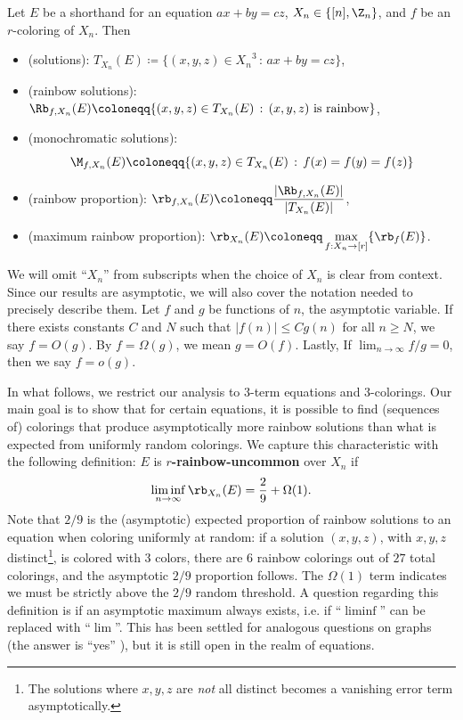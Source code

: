 Let $E$ be a shorthand for an equation $ax + by = cz$,
$X_n \in \{[n], \Z_n\}$, and $f$ be an $r$-coloring of $X_n$. Then
\begin{itemize}
    \item (solutions): $T_{X_n}(E) \coloneqq \{(x, y, z) \in {X_n}^3 \,:\, ax + by = cz\}$,
    \item (rainbow solutions): $\Rb_{f, X_n}(E) \coloneqq \{(x,y,z) \in T_{X_n}(E) \,:\, \text{$(x,y,z)$ is rainbow}\}$,
    \item (monochromatic solutions): 
    \[\M_{f, X_n}(E) \coloneqq \{(x,y,z) \in T_{X_n}(E) \,:\, f(x) = f(y) = f(z)\}\]
    \item (rainbow proportion): $\displaystyle \rb_{f, X_n}(E) \coloneqq \frac{|\Rb_{f, X_n}(E)|}{|T_{X_n}(E)|}$,
    \item (maximum rainbow proportion): $\displaystyle \rb_{X_n}(E) \coloneqq \max_{f : {X_n} \to [r]}\{\rb_{f}(E)\}$.
\end{itemize}
We will omit ``$X_n$'' from subscripts when the choice of $X_n$ is clear from context. Since our results are asymptotic, we will also cover the notation needed to precisely describe them.
Let $f$ and $g$ be functions of $n$, the asymptotic variable. If there exists constants $C$ and $N$ such that 
$|f(n)| \leq Cg(n)$ for all $n \geq N$, we say $f = O(g)$. By $f = \Omega(g)$, we mean $g = O(f)$.
Lastly, If $\lim_{n\to\infty}f/g = 0$, then we say $f = o(g)$.

In what follows, we restrict our analysis to $3$-term equations and $3$-colorings.
Our main goal is to show that for certain equations, it is possible to find (sequences of) colorings that produce asymptotically more rainbow
solutions than what is expected from uniformly random colorings.
We capture this characteristic with the following definition:
$E$ is \textbf{$r$-rainbow-uncommon} over $X_n$ if 
\begin{equation}
\liminf_{n\to\infty} \rb_{X_n}(E) = \frac{2}{9} + \Omega(1).
\end{equation}
Note that $2/9$ is the (asymptotic) expected proportion of rainbow solutions to an equation
when coloring uniformly at random:
if a solution $(x,y,z)$, with $x,y,z$ distinct\footnote{The
solutions where $x,y,z$ are \textit{not} all distinct becomes a vanishing error term asymptotically.
}, is colored with 3 colors, there are $6$ rainbow colorings
out of $27$ total colorings, and the asymptotic $2/9$ proportion follows.
The $\Omega(1)$ term indicates we must be strictly above the $2/9$ random threshold.
A question regarding this definition is if
an asymptotic maximum always exists, i.e. if ``$\liminf$'' can be replaced with ``$\lim$''.
This has been settled for analogous questions on graphs 
(the answer is ``yes'' \cite{D2018}), 
but it is still open in the realm 
of equations.

